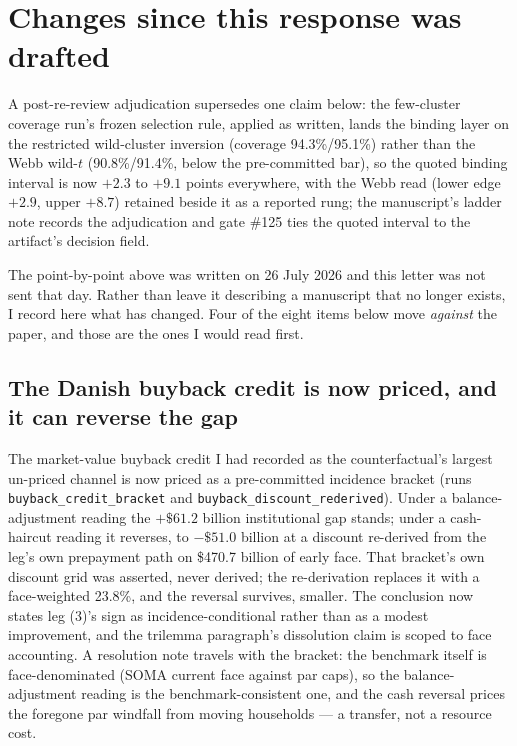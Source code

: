 \documentclass[11pt]{article}
\begin{document}
\section{Changes since this response was drafted}

A post-re-review adjudication supersedes one claim below: the few-cluster coverage run's frozen selection rule, applied as written, lands the binding layer on the restricted wild-cluster inversion (coverage 94.3\%/95.1\%) rather than the Webb wild-$t$ (90.8\%/91.4\%, below the pre-committed bar), so the quoted binding interval is now $+2.3$ to $+9.1$ points everywhere, with the Webb read (lower edge $+2.9$, upper $+8.7$) retained beside it as a reported rung; the manuscript's ladder note records the adjudication and gate \#125 ties the quoted interval to the artifact's decision field.


The point-by-point above was written on 26 July 2026 and this letter was not sent
that day. Rather than leave it describing a manuscript that no longer exists, I
record here what has changed. Four of the eight items below move \emph{against} the
paper, and those are the ones I would read first.

\subsection{The Danish buyback credit is now priced, and it can reverse the gap}

The market-value buyback credit I had recorded as the counterfactual's largest
un-priced channel is now priced as a pre-committed incidence bracket (runs
\texttt{buyback\_credit\_bracket} and \texttt{buyback\_discount\_rederived}).
Under a balance-adjustment reading the $+\$61.2$ billion institutional gap
stands; under a cash-haircut reading it reverses, to $-\$51.0$ billion at a
discount re-derived from the leg's own prepayment path on \$470.7 billion of
early face. That bracket's own discount grid was asserted, never derived; the
re-derivation replaces it with a face-weighted 23.8\%, and the reversal
survives, smaller. The conclusion now states
leg (3)'s sign as incidence-conditional rather than as a modest improvement,
and the trilemma paragraph's dissolution claim is scoped to face accounting.
A resolution note travels with the bracket: the benchmark itself is
face-denominated (SOMA current face against par caps), so the
balance-adjustment reading is the benchmark-consistent one, and the cash
reversal prices the foregone par windfall from moving households --- a
transfer, not a resource cost.
\end{document}
